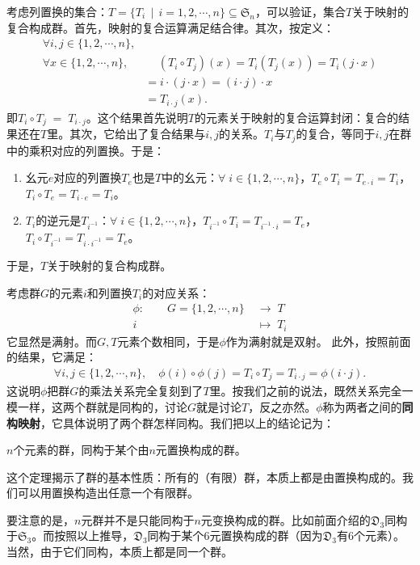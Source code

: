 \documentclass[12pt,UTF8,fontset=none]{ctexbook}
\begin{document}
考虑列置换的集合：$T = \{T_i\,\mid\,i=1,2,\cdots,n\}\subseteq \mathfrak{S}_n$，可以验证，集合$T$关于映射的复合构成群。首先，映射的复合运算满足结合律。其次，按定义：
\begin{align*}
    \forall i,j\in\{1,2,\cdots,n\},&\\
 \forall x\in\{1,2,\cdots,n\},&\quad\, (T_i\circ T_j)(x) = T_i(T_j(x)) = T_i(j\cdot x) \\
 &= i\cdot (j\cdot x) = (i\cdot j)\cdot x \\
 &= T_{i\cdot j}(x).
\end{align*}
即$T_i\circ T_j \;=\; T_{i\cdot j}$。这个结果首先说明$T$的元素关于映射的复合运算封闭：复合的结果还在$T$里。其次，它给出了复合结果与$i,j$的关系。$T_i$与$T_j$的复合，等同于$i,j$在群中的乘积对应的列置换。于是：
\begin{enumerate}
    \item 幺元$e$对应的列置换$T_e$也是$T$中的幺元：$\forall\;i\in\{1,2,\cdots,n\}$，$T_e\circ T_i = T_{e\cdot i} = T_{i}$，$T_i\circ T_e = T_{i\cdot e} = T_{i}$。
    \item $T_i$的逆元是$T_{i^{-1}}$：$\forall\;i\in\{1,2,\cdots,n\}$，$T_{i^{-1}}\circ T_i = T_{i^{-1}\cdot i} = T_{e}$，$T_{i}\circ T_{i^{-1}} = T_{i\cdot i^{-1}} = T_{e}$。
\end{enumerate}
于是，$T$关于映射的复合构成群。

考虑群$G$的元素$i$和列置换$T_i$的对应关系：
\begin{align*}
    \phi:\qquad G = \{1,2,\cdots,n\}\; &\longrightarrow \;T\\
    i \qquad\; &\longmapsto \; T_i
\end{align*}
它显然是满射。而$G,T$元素个数相同，于是$\phi$作为满射就是双射。
此外，按照前面的结果，它满足：
\begin{align*}
    \forall i,j\in\{1,2,\cdots,n\},\quad\phi(i)\circ\phi(j) = T_i\circ T_j = T_{i\cdot j} = \phi(i\cdot j).
\end{align*}
这说明$\phi$把群$G$的乘法关系完全复刻到了$T$里。按我们之前的说法，既然关系完全一模一样，这两个群就是同构的，讨论$G$就是讨论$T$，反之亦然。$\phi$称为两者之间的\textbf{同构映射}，它具体说明了两个群怎样同构。我们把以上的结论记为：
\begin{tm}[置换群定理]\label{tm:4-10}
    $n$个元素的群，同构于某个由$n$元置换构成的群。
\end{tm}
这个定理揭示了群的基本性质：所有的（有限）群，本质上都是由置换构成的。我们可以用置换构造出任意一个有限群。

要注意的是，$n$元群并不是只能同构于$n$元变换构成的群。比如前面介绍的$\mathfrak{D}_3$同构于$\mathfrak{S}_3$。而按照以上推导，$\mathfrak{D}_3$同构于某个$6$元置换构成的群（因为$\mathfrak{D}_3$有$6$个元素）。当然，由于它们同构，本质上都是同一个群。
\end{document}
